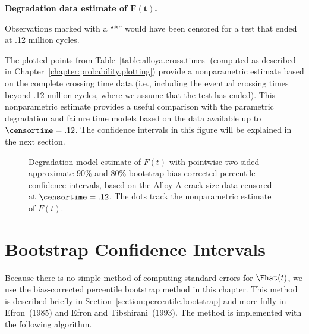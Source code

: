 \begin{example}{\bfseries Degradation data estimate of $\boldsymbol{F(t)}$.}
\begin{table}
\begin{minipage}[t]{4in}
Observations marked with a ``*'' would have been censored
for a test that ended at .12 million cycles.
\end{minipage}
\label{table:alloya.cross.times}
\end{table}
The plotted points from Table~\ref{table:alloya.cross.times} (computed
as described in Chapter~\ref{chapter:probability.plotting}) provide a
nonparametric estimate based on the complete crossing time data (i.e.,
including the eventual crossing times beyond .12 million cycles, where
we assume that the test has ended).  This nonparametric estimate
provides a useful comparison with the parametric degradation and
failure time models based on the data available up to
$\censortime=.12$.  The confidence intervals in this figure will be
explained in the next section.
\end{example}
\begin{figure}
\caption{Degradation model estimate of $F(t)$ with pointwise
two-sided approximate 90\% and 80\% bootstrap bias-corrected
percentile confidence intervals, based on the Alloy-A crack-size data
censored at $\censortime=.12$.  The dots track the nonparametric
estimate of $F(t)$.}
\label{figure:bk.fatigue.fhat.and.ci.ps}
\end{figure}

\section{Bootstrap Confidence Intervals }
\label{section:degrad.ci}
Because there is no simple method of computing standard errors for
$\Fhat(t)$, we use the bias-corrected percentile bootstrap method in
this chapter.  This method is described briefly in
Section~\ref{section:percentile.bootstrap} and more fully in
Efron~(1985) and Efron and Tibshirani~(1993). The method is
implemented with the following algorithm.

